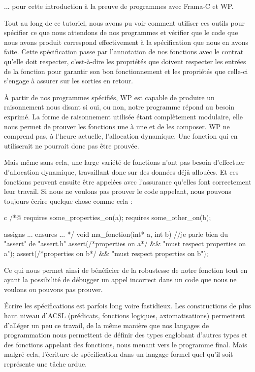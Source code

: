 \documentclass[middle]{zmdocument}
\begin{document}
... pour cette introduction à la preuve de programmes avec Frama-C et WP.



Tout au long de ce tutoriel, nous avons pu voir comment utiliser ces outils
pour spécifier ce que nous attendons de nos programmes et vérifier que le code que
nous avons produit correspond effectivement à la spécification que nous en 
avons faite. Cette spécification passe par l'annotation de nos fonctions avec 
le contrat qu'elle doit respecter, c'est-à-dire les propriétés que doivent
respecter les entrées de la fonction pour garantir son bon fonctionnement et 
les propriétés que celle-ci s'engage à assurer sur les sorties en retour.



À partir de nos programmes spécifiés, WP est capable de produire un 
raisonnement nous disant si oui, ou non, notre programme répond au besoin 
exprimé. La forme de raisonnement utilisée étant complètement modulaire, elle 
nous permet de prouver les fonctions une à une et de les composer. WP ne 
comprend pas, à l'heure actuelle, l'allocation dynamique. Une fonction qui en 
utiliserait ne pourrait donc pas être prouvée.



Mais même sans cela, une large variété de fonctions n'ont pas besoin 
d'effectuer d'allocation dynamique, travaillant donc sur des données déjà 
allouées. Et ces fonctions peuvent ensuite être appelées avec l'assurance 
qu'elles font correctement leur travail. Si nous ne voulons pas prouver le 
code appelant, nous pouvons toujours écrire quelque chose comme cela :



\begin{CodeBlock}{c}
/*@
  requires some_properties_on(a);
  requires some_other_on(b);

  assigns ...
  ensures ...
*/
void ma_fonction(int* a, int b){
  //je parle bien du "assert" de "assert.h"
  assert(/*properties on a*/ && "must respect properties on a");  
  assert(/*properties on b*/ && "must respect properties on b");
}
\end{CodeBlock}



Ce qui nous permet ainsi de bénéficier de la robustesse de notre fonction tout en
ayant la possibilité de débugger un appel incorrect dans un code que nous ne 
voulons ou pouvons pas prouver.



Écrire les spécifications est parfois long voire fastidieux. Les constructions 
de plus haut niveau d'ACSL (prédicats, fonctions logiques, axiomatisations) 
permettent d'alléger un peu ce travail, de la même manière que nos langages de
programmation nous permettent de définir des types englobant d'autres types et
des fonctions appelant des fonctions, nous menant vers le programme final. Mais
malgré cela, l'écriture de spécification dans un langage formel quel qu'il soit
représente une tâche ardue.
\end{document}
